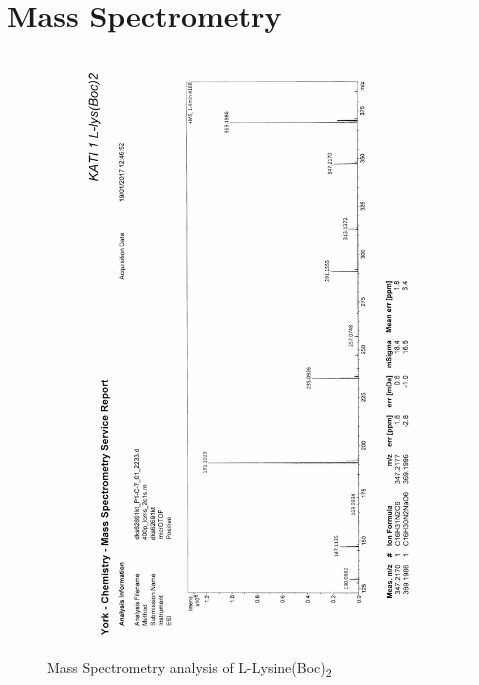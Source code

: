 \chapter{Mass Spectrometry} %
\label{AppendixB} %

\begin{figure}[ht!]
\centering
\includegraphics[scale=0.75]{Mass_Spec/KAT1_1.PDF}
\caption{Mass Spectrometry analysis of L-Lysine(Boc)\textsubscript{2}}
\end{figure}

